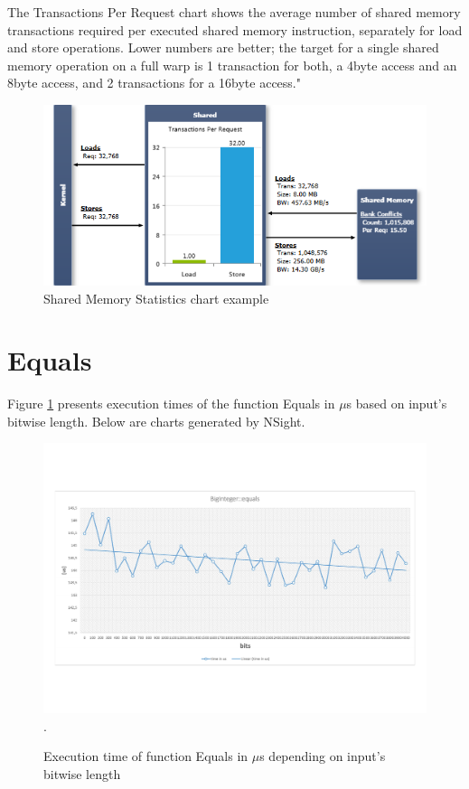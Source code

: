 \documentclass[oneside,openright,12pt,final,en]{mgr}
\begin{document}
\begin{itemize}
	The Transactions Per Request chart shows the average number of shared memory transactions required per executed shared memory instruction, separately for load and store operations. Lower numbers are better; the target for a single shared memory operation on a full warp is 1 transaction for both, a 4byte access and an 8byte access, and 2 transactions for a 16byte access."
	
	\begin{figure}[H]
		\centering
		\includegraphics{MemoryStatisticsSharedChart}
		\caption{Shared Memory Statistics chart example}
	\end{figure}

\end{itemize}


\section{Equals}
Figure \ref{fig:equals} presents execution times of the function Equals in $\mu$s based on input's bitwise length. Below are charts generated by NSight.
\begin{figure}[H]
	\centering
	\includegraphics[width=\textwidth,trim={0 2.5cm 0 2.5cm},clip]{equals.pdf}.
	\caption{Execution time of function Equals in $\mu$s depending on input's bitwise length}
	\label{fig:equals}
\end{figure}
\end{document}
